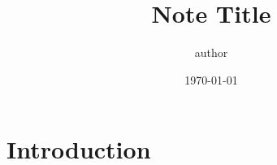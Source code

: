 \documentclass[a4paper,12pt]{article}
\title{Note Title}
\author{author}
\date{\today}
\theoremstyle{plain}
\theoremstyle{definition}
\theoremstyle{remark}
\numberwithin{equation}{section} %
\begin{document}
\maketitle
%

\section{Introduction}




\label{sec:ref}

%
%
\end{document}
